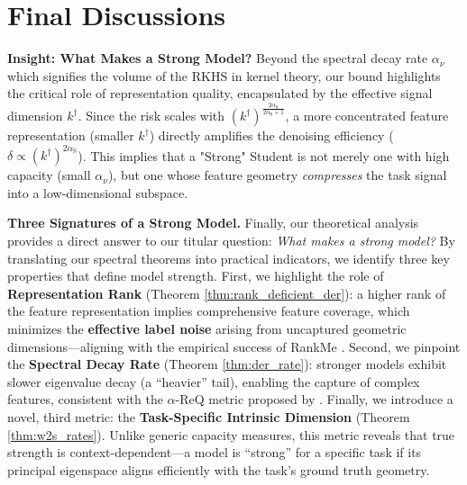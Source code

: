 \documentclass{article}
\theoremstyle{definition}
\theoremstyle{definition}
\theoremstyle{plain}
\theoremstyle{plain}
\theoremstyle{plain}
\theoremstyle{plain}
\theoremstyle{plain}
\newcommand{\st}{\mathrm{S}}
\begin{document}
\section{Final Discussions}


\textbf{Insight: What Makes a Strong Model?} 
Beyond the spectral decay rate $\alpha_\nu$ which signifies the volume of the RKHS in kernel theory, our bound highlights the critical role of representation quality, encapsulated by the effective signal dimension $k^\dagger$.
Since the risk scales with $(k^\dagger)^{\frac{2\alpha_\st}{2\alpha_\st+1}}$, a more concentrated feature representation (smaller $k^\dagger$) directly amplifies the denoising efficiency ($\delta \propto (k^\dagger)^{2\alpha_\st}$).
This implies that a "Strong" Student is not merely one with high capacity (small $\alpha_\nu$), but one whose feature geometry \textit{compresses} the task signal into a low-dimensional subspace.

\textbf{Three Signatures of a Strong Model.}
Finally, our theoretical analysis provides a direct answer to our titular question: \emph{What makes a strong model?} By translating our spectral theorems into practical indicators, we identify three key properties that define model strength.
First, we highlight the role of \textbf{Representation Rank} (Theorem \ref{thm:rank_deficient_der}): a higher rank of the feature representation implies comprehensive feature coverage, which minimizes the \textbf{effective label noise} arising from uncaptured geometric dimensions---aligning with the empirical success of RankMe \citep{garrido2023rankmeassessingdownstreamperformance}.
Second, we pinpoint the \textbf{Spectral Decay Rate} (Theorem \ref{thm:der_rate}): stronger models exhibit slower eigenvalue decay (a ``heavier'' tail), enabling the capture of complex features, consistent with the $\alpha$-ReQ metric proposed by \citet{Agrawal2022alphaReQA}.
Finally, we introduce a novel, third metric: the \textbf{Task-Specific Intrinsic Dimension} (Theorem \ref{thm:w2s_rates}). Unlike generic capacity measures, this metric reveals that true strength is context-dependent---a model is ``strong'' for a specific task if its principal eigenspace aligns efficiently with the task's ground truth geometry.
\end{document}
